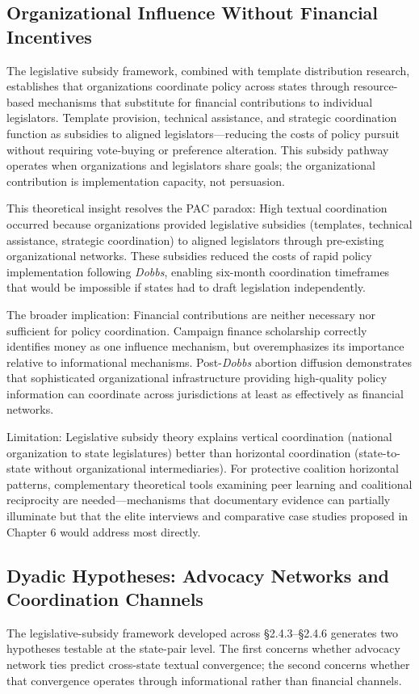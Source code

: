 \subsection{Organizational Influence Without Financial Incentives}
\label{wofinancial}

The legislative subsidy framework, combined with template distribution research, establishes that organizations coordinate policy across states through resource-based mechanisms that substitute for financial contributions to individual legislators. Template provision, technical assistance, and strategic coordination function as subsidies to aligned legislators---reducing the costs of policy pursuit without requiring vote-buying or preference alteration. This subsidy pathway operates when organizations and legislators share goals; the organizational contribution is implementation capacity, not persuasion.

This theoretical insight resolves the PAC paradox: High textual coordination occurred because organizations provided legislative subsidies (templates, technical assistance, strategic coordination) to aligned legislators through pre-existing organizational networks. These subsidies reduced the costs of rapid policy implementation following \emph{Dobbs}, enabling six-month coordination timeframes that would be impossible if states had to draft legislation independently.

The broader implication: Financial contributions are neither necessary nor sufficient for policy coordination. Campaign finance scholarship correctly identifies money as one influence mechanism, but overemphasizes its importance relative to informational mechanisms. Post-\emph{Dobbs} abortion diffusion demonstrates that sophisticated organizational infrastructure providing high-quality policy information can coordinate across jurisdictions at least as effectively as financial networks.

Limitation: Legislative subsidy theory explains vertical coordination (national organization to state legislatures) better than horizontal coordination (state-to-state without organizational intermediaries). For protective coalition horizontal patterns, complementary theoretical tools examining peer learning and coalitional reciprocity are needed---mechanisms that documentary evidence can partially illuminate but that the elite interviews and comparative case studies proposed in Chapter 6 would address most directly.

\subsection{Dyadic Hypotheses: Advocacy Networks and Coordination Channels}
The legislative-subsidy framework developed across §2.4.3--§2.4.6 generates two hypotheses testable at the state-pair level. The first concerns whether advocacy network ties predict cross-state textual convergence; the second concerns whether that convergence operates through informational rather than financial channels.

